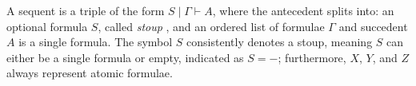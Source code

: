 \documentclass[sn-mathphys-num]{sn-jnl}%
\newcommand{\vdG}{\vdash}
\theoremstyle{thmstyleone}%
\theoremstyle{thmstyletwo}%
\theoremstyle{thmstylethree}%
\begin{document}
A sequent is a triple of the form $S \mid \Gamma \vdG A$, where the antecedent splits into: an optional formula $S$, called \emph{stoup} \cite{girard:constructive:91}, and an ordered list of formulae $\Gamma$ and succedent $A$ is a single formula.
The symbol $S$ consistently denotes a stoup, meaning $S$ can either be a single formula or empty, indicated as $S = {-}$; furthermore, $X$, $Y$, and $Z$ always represent atomic formulae.
\end{document}
